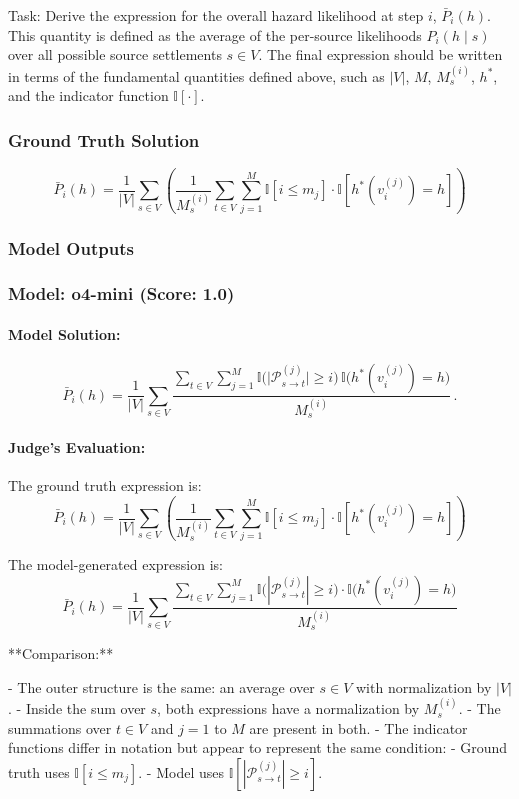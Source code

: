 \documentclass[10pt]{article}
\begin{document}
Task:
Derive the expression for the overall hazard likelihood at step $i$, $\bar{P}_i(h)$. This quantity is defined as the average of the per-source likelihoods $P_i(h \mid s)$ over all possible source settlements $s \in V$. The final expression should be written in terms of the fundamental quantities defined above, such as $|V|$, $M$, $M_s^{(i)}$, $h^*$, and the indicator function $\mathbb{I}[\cdot]$.

\subsubsection*{Ground Truth Solution}
\[ \boxed{\bar{P}_i(h) = \frac{1}{|V|} \sum_{s \in V} \left( \frac{1}{M_s^{(i)}} \sum_{t \in V} \sum_{j=1}^{M} \mathbb{I}[i \leq m_j] \cdot \mathbb{I}[h^*(v^{(j)}_i) = h] \right)} \]

\subsubsection*{Model Outputs}
\subsubsection*{Model: o4-mini (Score: 1.0)}
\paragraph*{Model Solution:}
\[ \bar P_i(h)
=
\frac1{|V|}\sum_{s\in V}
\frac{
  \sum_{t\in V}\sum_{j=1}^M
    \mathbb{I}\bigl(\lvert\mathcal P^{(j)}_{s\to t}\rvert\ge i\bigr)\,
    \mathbb{I}\bigl(h^*(v^{(j)}_{i})=h\bigr)
}{M_s^{(i)}}\,. \]

\paragraph*{Judge's Evaluation:}

The ground truth expression is:
\[
\bar{P}_i(h) = \frac{1}{|V|} \sum_{s \in V} \left( \frac{1}{M_s^{(i)}} \sum_{t \in V} \sum_{j=1}^{M} \mathbb{I}[i \leq m_j] \cdot \mathbb{I}[h^*(v^{(j)}_i) = h] \right)
\]

The model-generated expression is:
\[
\bar{P}_i(h) = \frac{1}{|V|} \sum_{s \in V} \frac{
  \sum_{t \in V} \sum_{j=1}^M \mathbb{I}\bigl(|\mathcal{P}^{(j)}_{s \to t}| \ge i\bigr) \cdot \mathbb{I}\bigl(h^*(v^{(j)}_i) = h\bigr)
}{M_s^{(i)}}
\]

**Comparison:**

- The outer structure is the same: an average over $s \in V$ with normalization by $|V|$.
- Inside the sum over $s$, both expressions have a normalization by $M_s^{(i)}$.
- The summations over $t \in V$ and $j=1$ to $M$ are present in both.
- The indicator functions differ in notation but appear to represent the same condition:
  - Ground truth uses $\mathbb{I}[i \leq m_j]$.
  - Model uses $\mathbb{I}[|\mathcal{P}^{(j)}_{s \to t}| \ge i]$.
  
\end{document}
